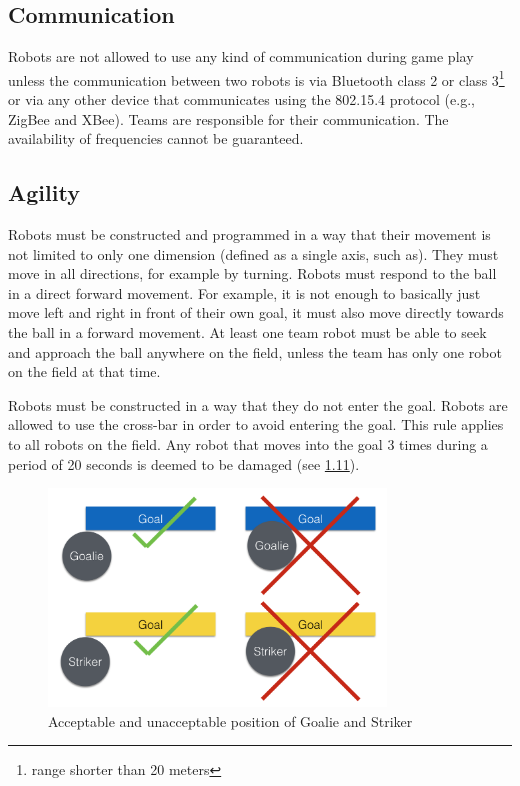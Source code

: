\documentclass{article}
\begin{document}
\subsection{ Communication \label{ref-022}}

Robots are not allowed to use any kind of communication during game play unless
the communication between two robots is via Bluetooth class 2 or class
3\footnote{range shorter than 20 meters} or via any other device that
communicates using the 802.15.4 protocol (e.g., ZigBee and XBee). Teams are
responsible for their communication. The availability of frequencies cannot be
guaranteed.

\subsection{Agility \label{ref-023}}

Robots must be constructed and programmed in a way that their movement is not
limited to only one dimension (defined as a single axis, such as). They must move in all
directions, for example by turning. Robots must respond to the ball in a direct
forward movement. For example, it is not enough to basically just move left and
right in front of their own goal, it must also move directly towards the ball in
a forward movement. At least one team robot must be able to seek and approach
the ball anywhere on the field, unless the team has only one robot on the field
at that time. 

Robots must be constructed in a way that they do
not enter the goal. Robots are allowed to use the cross-bar in order to avoid
entering the goal. This rule applies to all robots on the field. Any robot
that moves into the goal 3 times during a period of 20 seconds is deemed to be
damaged (see \hyperref[ref-012]{1.11}).

\begin{figure}[H]
    \centering
    \includegraphics[width=0.8\textwidth]{media/image3.png}
    \caption{Acceptable and unacceptable position of Goalie and Striker}
    \label{fig:robot_in_goal}
\end{figure}
\end{document}
